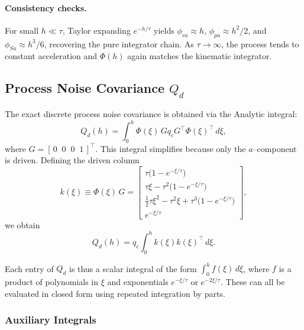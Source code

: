 \documentclass[10pt]{extarticle}
\begin{document}
\paragraph{Consistency checks.}
For small $h \ll \tau$, Taylor expanding $e^{-h/\tau}$ yields
$\phi_{va} \approx h$, $\phi_{pa} \approx h^2/2$, and
$\phi_{Sa} \approx h^3/6$, recovering the pure integrator chain.  
As $\tau \to \infty$, the process tends to constant acceleration and
$\Phi(h)$ again matches the kinematic integrator.  

\subsection{Process Noise Covariance $Q_d$}

The exact discrete process noise covariance is obtained via the
Analytic integral:
%
\begin{equation}
Q_d(h) = \int_0^h \Phi(\xi)\, G q_c G^\top \Phi(\xi)^\top \, d\xi,
\end{equation}
%
where $G = [\,0\;\;0\;\;0\;\;1\,]^\top$.
This integral simplifies because only the $a$--component is driven.
Defining the driven column
%
\begin{equation}
k(\xi) \equiv \Phi(\xi)\,G =
\begin{bmatrix}
\tau \bigl(1 - e^{-\xi/\tau}\bigr) \\
\tau \xi - \tau^2\bigl(1 - e^{-\xi/\tau}\bigr) \\
\frac{1}{2}\tau \xi^2 - \tau^2 \xi + \tau^3\bigl(1 - e^{-\xi/\tau}\bigr) \\
e^{-\xi/\tau}
\end{bmatrix},
\end{equation}
we obtain
\begin{equation}
Q_d(h) = q_c \int_0^h k(\xi) k(\xi)^\top \, d\xi.
\end{equation}

Each entry of $Q_d$ is thus a scalar integral of the form
$\int_0^h f(\xi)\, d\xi$, where $f$ is a product of polynomials in $\xi$
and exponentials $e^{-\xi/\tau}$ or $e^{-2\xi/\tau}$. These can all be
evaluated in closed form using repeated integration by parts.

\subsubsection{Auxiliary Integrals}
\end{document}
